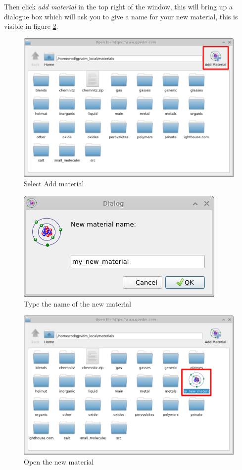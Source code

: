 Then click \emph{add material} in the top right of the window, this will bring up a dialogue box which will ask you to give a name for your new material, this is visible in figure \ref{fig:materialadd3}.
\begin{figure}[H]
\centering
\includegraphics[height=0.5\textwidth]{./images/database_materials_add.png}
\caption{Select Add material}
\label{fig:materialadd2}
\end{figure}

\begin{figure}[H]
\centering
\includegraphics[height=0.2\textwidth]{./images/database_materials_set_name.png}
\caption{Type the name of the new material}
\label{fig:materialadd3}
\end{figure}

\begin{figure}[H]
\centering
\includegraphics[height=0.5\textwidth]{./images/database_materials_open.png}
\caption{Open the new material}
\label{fig:materialadd4}
\end{figure}

